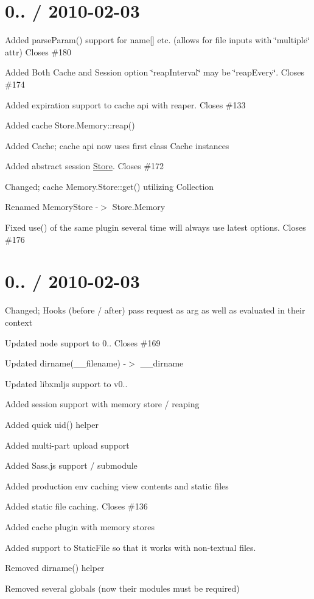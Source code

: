 \section*{0.. / 2010-\/02-\/03 }


\begin{DoxyItemize}
\item Added parse\+Param() support for name\mbox{[}\mbox{]} etc. (allows for file inputs with \char`\"{}multiple\char`\"{} attr) Closes \#180
\item Added Both Cache and Session option \char`\"{}reap\+Interval\char`\"{} may be \char`\"{}reap\+Every\char`\"{}. Closes \#174
\item Added expiration support to cache api with reaper. Closes \#133
\item Added cache Store.\+Memory\+::reap()
\item Added Cache; cache api now uses first class Cache instances
\item Added abstract session \hyperlink{class_store}{Store}. Closes \#172
\item Changed; cache Memory.\+Store\+::get() utilizing Collection
\item Renamed Memory\+Store -\/$>$ Store.\+Memory
\item Fixed use() of the same plugin several time will always use latest options. Closes \#176
\end{DoxyItemize}

\section*{0.. / 2010-\/02-\/03 }


\begin{DoxyItemize}
\item Changed; Hooks (before / after) pass request as arg as well as evaluated in their context
\item Updated node support to 0.. Closes \#169
\item Updated dirname(\+\_\+\+\_\+filename) -\/$>$ \+\_\+\+\_\+dirname
\item Updated libxmljs support to v0..
\item Added session support with memory store / reaping
\item Added quick uid() helper
\item Added multi-\/part upload support
\item Added Sass.\+js support / submodule
\item Added production env caching view contents and static files
\item Added static file caching. Closes \#136
\item Added cache plugin with memory stores
\item Added support to Static\+File so that it works with non-\/textual files.
\item Removed dirname() helper
\item Removed several globals (now their modules must be required)
\end{DoxyItemize}

